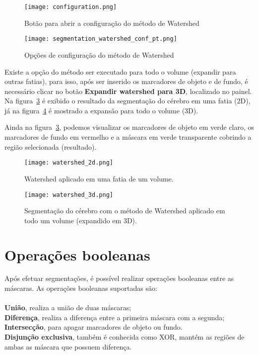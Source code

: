 \begin{figure}[!htb]
\centering
\texttt{[image: configuration.png]}
\caption{Botão para abrir a configuração do método de Watershed}
\label{fig:watershed_conf}
\end{figure}

\begin{figure}[!htb]
\centering
\texttt{[image: segmentation\_watershed\_conf\_pt.png]}
\caption{Opções de configuração do método de Watershed}
\label{fig:watershed_janela_conf}
\end{figure}

Existe a opção do método ser executado para todo o volume (expandir para outras fatias), para isso, após ser inserido os marcadores de objeto e de fundo, é necessário clicar no botão \textbf{Expandir watershed para 3D}, localizado no painel. Na figura~\ref{fig:watershed_2d} é exibido o resultado da segmentação do cérebro em uma fatia (2D), já na figura~\ref{fig:watershed_3d} é mostrado a expansão para todo o volume (3D). 

Ainda na figura~\ref{fig:watershed_2d}, podemos visualizar os marcadores de objeto em verde claro, os marcadores de fundo em vermelho e a máscara em verde transparente cobrindo a região selecionada (resultado).

\begin{figure}[!htb]
\centering
\texttt{[image: watershed\_2d.png]}
\caption{Watershed aplicado em uma fatia de um volume.}
\label{fig:watershed_2d}
\end{figure}

\begin{figure}[!htb]
\centering
\texttt{[image: watershed\_3d.png]}
\caption{Segmentação do cérebro com o método de Watershed aplicado em todo um volume (expandido em 3D).}
\label{fig:watershed_3d}
\end{figure}

\section{Operações booleanas}

Após efetuar segmentações, é possível realizar operações booleanas entre as máscaras. As operações booleanas suportadas são:\\
\\
\textbf{União}, realiza a união de duas máscaras;\\
\textbf{Diferença}, realiza a diferença entre a primeira máscara com a segunda;\\
\textbf{Intersecção}, para apagar marcadores de objeto ou fundo.\\
\textbf{Disjunção exclusiva}, também é conhecida como XOR, mantém as regiões de ambas as máscara que possuem diferença.\\

